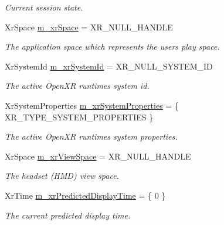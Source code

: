 \begin{DoxyCompactItemize}
\begin{DoxyCompactList}\small\item\em Current session state. \end{DoxyCompactList}\item 
Xr\+Space \mbox{\hyperlink{class_open_x_r_provider_1_1_x_r_provider_a1e442b83ade02dc6341d586779086049}{m\+\_\+xr\+Space}} = X\+R\+\_\+\+N\+U\+L\+L\+\_\+\+H\+A\+N\+D\+LE
\begin{DoxyCompactList}\small\item\em The application space which represents the user\textquotesingle{}s play space. \end{DoxyCompactList}\item 
Xr\+System\+Id \mbox{\hyperlink{class_open_x_r_provider_1_1_x_r_provider_ac737e2e5b04bd924012ea0c40636c136}{m\+\_\+xr\+System\+Id}} = X\+R\+\_\+\+N\+U\+L\+L\+\_\+\+S\+Y\+S\+T\+E\+M\+\_\+\+ID
\begin{DoxyCompactList}\small\item\em The active Open\+XR runtime\textquotesingle{}s system id. \end{DoxyCompactList}\item 
Xr\+System\+Properties \mbox{\hyperlink{class_open_x_r_provider_1_1_x_r_provider_a88b5c958163af32297db09ffc49ae23b}{m\+\_\+xr\+System\+Properties}} = \{ X\+R\+\_\+\+T\+Y\+P\+E\+\_\+\+S\+Y\+S\+T\+E\+M\+\_\+\+P\+R\+O\+P\+E\+R\+T\+I\+ES \}
\begin{DoxyCompactList}\small\item\em The active Open\+XR runtime\textquotesingle{}s system properties. \end{DoxyCompactList}\item 
Xr\+Space \mbox{\hyperlink{class_open_x_r_provider_1_1_x_r_provider_a5c3ba17df358b63e82c13ae09700f943}{m\+\_\+xr\+View\+Space}} = X\+R\+\_\+\+N\+U\+L\+L\+\_\+\+H\+A\+N\+D\+LE
\begin{DoxyCompactList}\small\item\em The headset (H\+MD) view space. \end{DoxyCompactList}\item 
Xr\+Time \mbox{\hyperlink{class_open_x_r_provider_1_1_x_r_provider_a5606d0dca9ff04f8936eeb77d9a8cea2}{m\+\_\+xr\+Predicted\+Display\+Time}} = \{ 0 \}
\begin{DoxyCompactList}\small\item\em The current predicted display time. \end{DoxyCompactList}\end{DoxyCompactItemize}


